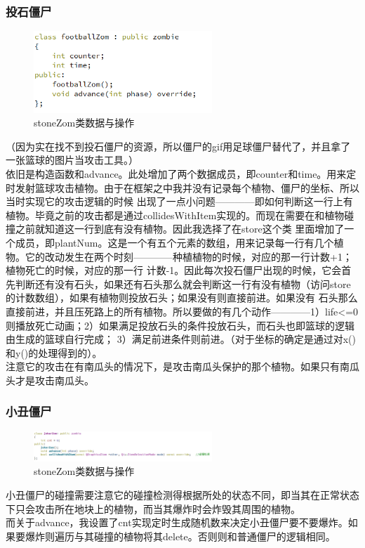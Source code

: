 \documentclass[12pt,a4paper,UTF8]{article}
\begin{document}
    \subsubsection{投石僵尸}
      \begin{figure}[H]
        \centering
      \includegraphics[width=0.6\textwidth]{figure/stoneZom.png}
      \caption{stoneZom类数据与操作}
      \end{figure}
      （因为实在找不到投石僵尸的资源，所以僵尸的gif用足球僵尸替代了，并且拿了一张篮球的图片当攻击工具。）\\
      依旧是构造函数和advance。此处增加了两个数据成员，即counter和time。用来定时发射篮球攻击植物。由于在框架之中我并没有记录每个植物、僵尸的坐标、所以当时实现它的攻击逻辑的时候
      出现了一点小问题————即如何判断这一行上有植物。毕竟之前的攻击都是通过collidesWithItem实现的。而现在需要在和植物碰撞之前就知道这一行到底有没有植物。因此我选择了在store这个类
      里面增加了一个成员，即plantNum。这是一个有五个元素的数组，用来记录每一行有几个植物。它的改动发生在两个时刻————种植植物的时候，对应的那一行计数+1；植物死亡的时候，对应的那一行
      计数-1。因此每次投石僵尸出现的时候，它会首先判断还有没有石头，如果还有石头那么就会判断这一行有没有植物（访问store的计数数组），如果有植物则投放石头；如果没有则直接前进。如果没有
      石头那么直接前进，并且压死路上的所有植物。所以要做的有几个动作————1）life<=0则播放死亡动画；2）如果满足投放石头的条件投放石头，而石头也即篮球的逻辑由生成的篮球自行完成；
      3）满足前进条件则前进。（对于坐标的确定是通过对x()和y()的处理得到的）。\\
      注意它的攻击在有南瓜头的情况下，是攻击南瓜头保护的那个植物。如果只有南瓜头才是攻击南瓜头。

    \subsubsection{小丑僵尸}
    \begin{figure}[H]
      \centering
    \includegraphics[width=0.6\textwidth]{figure/jokerZom.png}
    \caption{stoneZom类数据与操作}
    \end{figure}
    小丑僵尸的碰撞需要注意它的碰撞检测得根据所处的状态不同，即当其在正常状态下只会攻击所在地块上的植物，而当其爆炸时会炸毁其周围的植物。\\
    而关于advance，我设置了cnt实现定时生成随机数来决定小丑僵尸要不要爆炸。如果要爆炸则遍历与其碰撞的植物将其delete。否则则和普通僵尸的逻辑相同。
\end{document}
